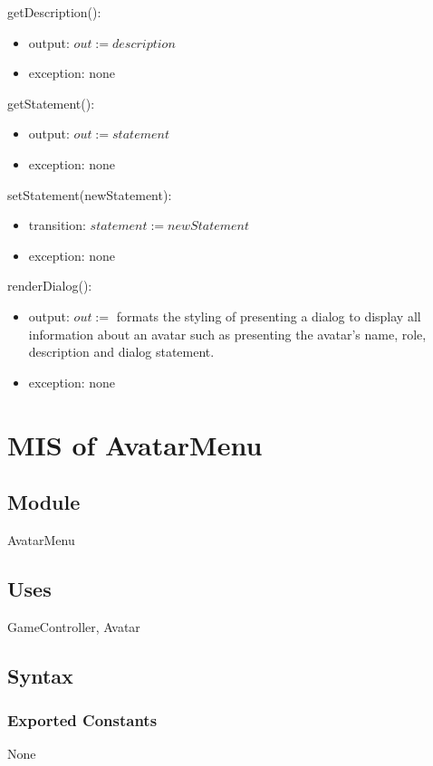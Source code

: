 \documentclass[12pt, titlepage]{article}
\begin{document}
\noindent getDescription():
\begin{itemize}
\item output: $out := \mathit{description}$
\item exception: none
\end{itemize}

\noindent getStatement():
\begin{itemize}
\item output: $out := \mathit{statement}$
\item exception: none
\end{itemize}

\noindent setStatement(newStatement):
\begin{itemize}
\item transition: $statement := \mathit{newStatement}$
\item exception: none
\end{itemize}

\noindent renderDialog():
\begin{itemize}
\item output: $out := $ formats the styling of presenting a dialog to display all information about an avatar such as presenting the avatar's name, role, description and dialog statement.  
\item exception: none
\end{itemize}


\newpage

\section{MIS of AvatarMenu} 


\subsection{Module}
AvatarMenu

\subsection{Uses}
GameController, Avatar


\subsection{Syntax}

\subsubsection{Exported Constants}
None
\end{document}
